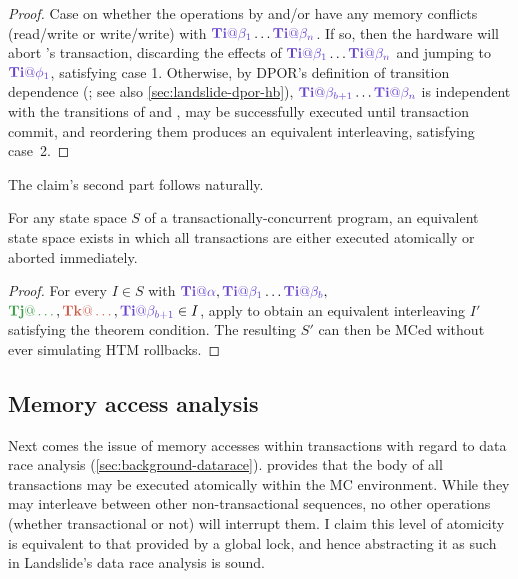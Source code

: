 \begin{proof}
	Case on whether the operations by \tjj and/or \tkk have any memory conflicts (read/\allowbreak{}write or write/write)
	with $\tiiat{\beta_1}\dots\tiiat{\beta_n}$.
	If so, then the hardware will abort \tii's transaction, discarding the effects of $\tiiat{\beta_1}\dots\tiiat{\beta_n}$
	and jumping to $\tiiat{\phi_1}$,
	satisfying case 1.
	Otherwise, by DPOR's definition of transition dependence (\cite{dpor}; see also \cref{sec:landslide-dpor-hb}),
	$\tiiat{\beta_{b+1}}\dots\tiiat{\beta_n}$ is independent with the transitions of \tjj and \tkk,
	may be successfully executed until transaction commit,
	and reordering them produces an equivalent interleaving,
	satisfying case~2.
\end{proof}

The claim's second part follows naturally.
\vspace{1em}

\begin{theorem}
	\label{thm:atom}
	For any state space $S$ of a transactionally-concurrent program,
	an equivalent state space exists in which all transactions are either executed atomically or aborted immediately.
\end{theorem}

\begin{proof}
	For every $I \in S$ with $\tiiat{\alpha},\tiiat{\beta_1}\dots\tiiat{\beta_b},$ $\tjjat{\dots},\tkkat{\dots},\tiiat{\beta_{b+1}} \in I$,
	apply  to obtain an equivalent interleaving $I'$ satisfying the theorem condition.
	The resulting $S'$ can then be MCed without ever simulating HTM rollbacks.
\end{proof}

\subsection{Memory access analysis}
\label{sec:tm-design-locks}

Next comes the issue of memory accesses within transactions with regard to data race analysis (\cref{sec:background-datarace}).
 provides that the body of all transactions may be executed atomically within the MC environment.
While they may interleave between other non-transactional sequences,
no other operations (whether transactional or not) will interrupt them.
I claim this level of atomicity is equivalent to that provided by a global lock,
and hence abstracting it as such in Landslide's data race analysis is sound.

